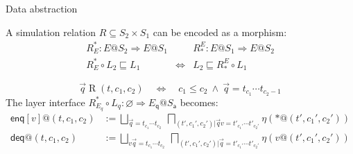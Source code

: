 \documentclass[aspectratio=141]{beamer}
\newcommand{\kw}[1]{\ensuremath{ \mathsf{#1} }}
\begin{document}
\begin{frame}{Data abstraction} %
  \begin{definition}
    A simulation relation $R \subseteq S_2 \times S_1$
    can be encoded as a morphism:
    \[
      \begin{array}{ccc}
        R^*_E : E@S_2 \Rightarrow E@S_1 & &
        R_*^E : E@S_1 \Rightarrow E@S_2 \\[1ex]
        R^*_E \circ L_2 \sqsubseteq L_1 &
        \Leftrightarrow &
        L_2 \sqsubseteq R_*^E \circ L_1
      \end{array}
    \]
  \end{definition}
  \pause
  \begin{example}
    \[
      \vec{q} \mathrel{R} (t, c_1, c_2)
      \quad \Leftrightarrow \quad
      c_1 \le c_2 \:\wedge\:
      \vec{q} = t_{c_1} \cdots t_{c_2 - 1}
    \]
    The layer interface
    $R^*_{E_q} \circ L_q : \varnothing \Rightarrow E_\kw{q}@S_\kw{a}$
    becomes:
    \begin{align*}
      \kw{enq}[v]@(t, c_1, c_2) &:=
        \bigsqcup_{\vec{q} = t_{c_1}\cdots t_{c_2}} \:
        \bigsqcap_{(t', c_1', c_2') | \vec{q}v = t'_{c_1'} \cdots t'_{c_2'}}
        \eta(*@(t', c_1', c_2')) \\
      \kw{deq}@(t, c_1, c_2) &:=
        \bigsqcup_{v\vec{q} = t_{c_1}\cdots t_{c_2}} \:
        \bigsqcap_{(t', c_1', c_2') | \vec{q} = t'_{c_1'} \cdots t'_{c_2'}}
        \eta(v@(t', c_1', c_2'))
    \end{align*}
  \end{example}
\end{frame}
\end{document}
